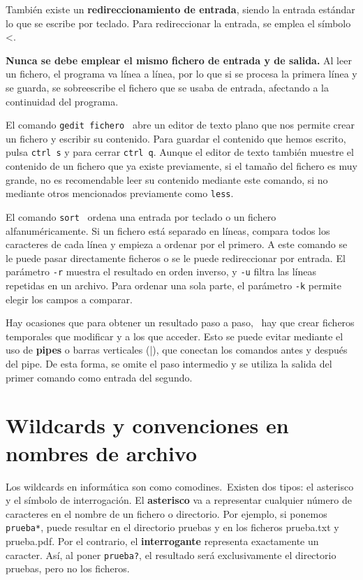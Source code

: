 También existe un \textbf{redireccionamiento de entrada}, siendo la entrada estándar lo que se escribe por teclado. Para redireccionar la entrada, se emplea el símbolo <.  \marginpar[\footnotesize <] \ 

\begin{table}[htbp]
\begin{mdframed}[backgroundcolor=red!10]
    \centering
    \textbf{Nunca se debe emplear el mismo fichero de entrada y de salida.} Al leer un fichero, el programa va línea a línea, por lo que si se procesa la primera línea y se guarda, se sobreescribe el fichero que se usaba de entrada, afectando a la continuidad del programa.
    \end{mdframed}
\end{table}

El comando \texttt{gedit fichero}  \ abre un editor de texto plano que nos permite crear un fichero y escribir su contenido. Para guardar el contenido que hemos escrito, pulsa \texttt{ctrl s} y para cerrar \texttt{ctrl q}. Aunque el editor de texto también muestre el contenido de un fichero que ya existe previamente, si el tamaño del fichero es muy grande, no es recomendable leer su contenido mediante este comando, si no mediante otros mencionados previamente como \texttt{less}.

El comando \texttt{sort}  \ ordena una entrada por teclado o un fichero alfanuméricamente. Si un fichero está separado en líneas, compara todos los caracteres de cada línea y empieza a ordenar por el primero. A este comando se le puede pasar directamente ficheros o se le puede redireccionar por entrada. El parámetro \texttt{-r} muestra el resultado en orden inverso, y \texttt{-u} filtra las líneas repetidas en un archivo. Para ordenar una sola parte, el parámetro \texttt{-k} permite elegir los campos a comparar.

Hay ocasiones que para obtener un resultado paso a paso,  \marginpar[\footnotesize |] \ hay que crear ficheros temporales que modificar y a los que acceder. Esto se puede evitar mediante el uso de \textbf{pipes} o barras verticales (|), que conectan los comandos antes y después del pipe. De esta forma, se omite el paso intermedio y se utiliza la salida del primer comando como entrada del segundo. 

\section{Wildcards y convenciones en nombres de archivo}
Los wildcards en informática son como comodines.\marginpar[\footnotesize * \\ ?] \ Existen dos tipos: el asterisco y el símbolo de interrogación. El \textbf{asterisco} va a representar cualquier número de caracteres en el nombre de un fichero o directorio. Por ejemplo, si ponemos \texttt{prueba*}, puede resultar en el directorio pruebas y en los ficheros prueba.txt y prueba.pdf. Por el contrario, el \textbf{interrogante} representa exactamente un caracter. Así, al poner \texttt{prueba?}, el resultado será exclusivamente el directorio pruebas, pero no los ficheros.

